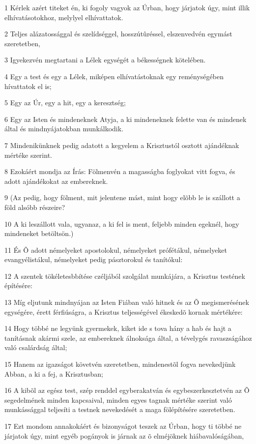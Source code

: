 \par 1 Kérlek azért titeket én, ki fogoly vagyok az Úrban, hogy járjatok úgy, mint illik elhívatásotokhoz, melylyel elhívattatok.
\par 2 Teljes alázatossággal és szelídséggel, hosszútûréssel, elszenvedvén egymást szeretetben,
\par 3 Igyekezvén megtartani a Lélek egységét a békességnek kötelében.
\par 4 Egy a test és egy a Lélek, miképen elhívatástoknak egy reménységében hívattatok el is;
\par 5 Egy az Úr, egy a hit, egy a keresztség;
\par 6 Egy az Isten és mindeneknek Atyja, a ki mindeneknek felette van és mindenek által és mindnyájatokban munkálkodik.
\par 7 Mindenikünknek pedig adatott a kegyelem a Krisztustól osztott ajándéknak mértéke szerint.
\par 8 Ezokáért mondja az Írás: Fölmenvén a magasságba foglyokat vitt fogva, és adott ajándékokat az embereknek.
\par 9 (Az pedig, hogy fölment, mit jelentene mást, mint hogy elõbb le is szállott a föld alsóbb részeire?
\par 10 A ki leszállott vala, ugyanaz, a ki fel is ment, feljebb minden egeknél, hogy mindeneket betöltsön.)
\par 11 És Õ adott némelyeket apostolokul, némelyeket prófétákul, némelyeket evangyélistákul, némelyeket pedig pásztorokul és tanítókul:
\par 12 A szentek tökéletesbbítése czéljából szolgálat munkájára, a Krisztus testének építésére:
\par 13 Míg eljutunk mindnyájan az Isten Fiában való hitnek és az Õ megismerésének egységére, érett férfiúságra, a Krisztus teljességével ékeskedõ kornak mértékére:
\par 14 Hogy többé ne legyünk gyermekek, kiket ide s tova hány a hab és hajt a tanításnak akármi szele, az embereknek álnoksága által, a tévelygés ravaszságához való csalárdság által;
\par 15 Hanem az igazságot követvén szeretetben, mindenestõl fogva nevekedjünk Abban, a ki a fej, a Krisztusban;
\par 16 A kibõl az egész test, szép renddel egyberakatván és egybeszerkesztetvén az Õ segedelmének minden kapcsaival, minden egyes tagnak mértéke szerint való munkássággal teljesíti a testnek nevekedését a maga fölépítésére szeretetben.
\par 17 Ezt mondom annakokáért és bizonyságot teszek az Úrban, hogy ti többé ne járjatok úgy, mint egyéb pogányok is járnak az õ elméjöknek hiábavalóságában,
